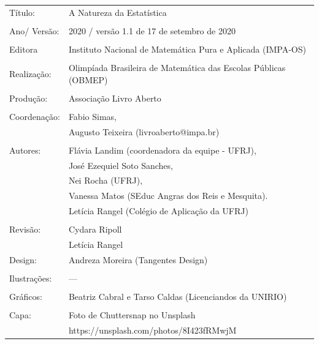 \begin{tabular}{p{}p{}}
Título: & A Natureza da Estatística\\
\\
Ano/ Versão: & 2020 / versão 1.1 de 17 de setembro de 2020\\
\\
Editora & Instituto Nacional de Matem\'atica Pura e Aplicada (IMPA-OS)\\
\\
Realização:& Olimp\'iada Brasileira de Matem\'atica das Escolas P\'ublicas (OBMEP)\\
\\
Produção:& Associação Livro Aberto\\
\\
Coordenação: & Fabio Simas, \\
             & Augusto Teixeira (livroaberto@impa.br)\\
\\
  Autores: & Flávia Landim (coordenadora da equipe - UFRJ),\\
        & José Ezequiel Soto Sanches,\\
        & Nei Rocha (UFRJ),\\
             & Vanessa Matos (SEduc Angras dos Reis e Mesquita).\\
             & Letícia Rangel (Colégio de Aplicação da UFRJ)\\
\\
Revisão: &  Cydara Ripoll  \\
		 &  Letícia Rangel
\\
Design: & Andreza Moreira (Tangentes Design) \\
\\
  Ilustrações: & --- \\ 
\\
Gráficos: & Beatriz Cabral e Tarso Caldas (Licenciandos da UNIRIO)\\
\\
  Capa: & Foto de Chuttersnap no Unsplash \\
        & https://unsplash.com/photos/8I423fRMwjM \\

\end{tabular}



